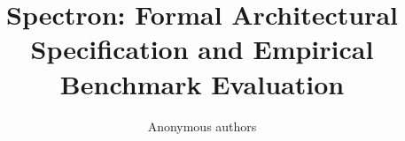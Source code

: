\title{\textbf{Spectron: Formal Architectural Specification and Empirical Benchmark Evaluation}}

\author{Anonymous authors}
